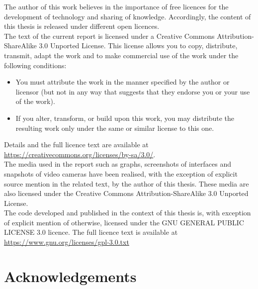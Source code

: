 The author of this work believes in the importance of free licences for the development of technology and sharing of knowledge.
Accordingly, the content of this thesis is released under different open licences.\\

The text of the current report is licensed under a Creative Commons Attribution-ShareAlike 3.0 Unported License.
This license allows you to copy, distribute, transmit, adapt the work and to make commercial use of the work under the following conditions:

\begin{itemize}
\item You must attribute the work in the manner specified by the author or licensor (but not in any way that suggests that they endorse you or your use of the work).
\item  If you alter, transform, or build upon this work, you may distribute the resulting work only under the same or similar license to this one. 
\end{itemize}

Details and the full licence text are available at \url{https://creativecommons.org/licenses/by-sa/3.0/}.\\

The media used in the report such as graphs, screenshots of interfaces and snapshots of video cameras have been realised, with the exception of explicit source mention in the related text, by the author of this thesis.
These media are also licensed under the Creative Commons Attribution-ShareAlike 3.0 Unported License.\\

The code developed and published in the context of this thesis is, with exception of explicit mention of otherwise, licensed under the GNU GENERAL PUBLIC LICENSE 3.0 licence. The full licence text is available at \url{https://www.gnu.org/licenses/gpl-3.0.txt}

\section{Acknowledgements}




